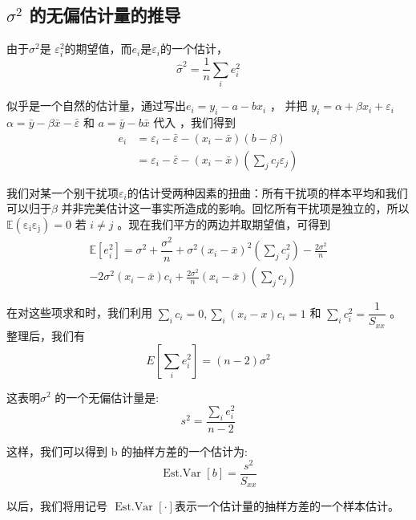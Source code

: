 \subsection{ \texorpdfstring{$ \sigma^{2} $}{σ2 } 的无偏估计量的推导}

由于$ \sigma^{2} $是 $ \varepsilon_{i} ^{2} $的期望值，而$e_{i}$是$\varepsilon_{i} $的一个估计，
$$ \hat{\sigma}^{2}=\frac{1}{n} \sum_{i} e_{i}^{2} $$

似乎是一个自然的估计量，通过写出$ e_{i} = y_{i} − a − bx_{i}  $ ， 并把 $  y_{i}=\alpha+\beta x_{i}+\varepsilon_{i} $  $\alpha=\bar{y}-\beta \bar{x}-\bar{\varepsilon}$
 和  $ a=\bar{y}-b \bar{x} $ 代入 ，我们得到
\begin{equation}
    \begin{aligned}
        e_{i} &=\varepsilon_{i}-\bar{\varepsilon}-\left(x_{i}-\bar{x}\right)(b-\beta) \\
              &=\varepsilon_{i}-\bar{\varepsilon}-\left(x_{i}-\bar{x}\right)\left(\sum_{j} c_{j} \varepsilon_{j}\right)
    \end{aligned}
    \label{eq 4.4.1}
\end{equation}

我们对某一个别干扰项$ \varepsilon_{i} $的估计受两种因素的扭曲：所有干扰项的样本平均和我们可以归于$ \beta $ 并非完美估计这一事实所造成的影响。回忆所有干扰项是独立的，所以 
$ \operatorname{ \mathbb{E}( \varepsilon_{i}  \varepsilon_{j} )} = 0 $ 若 $i \neq j$ 。现在我们平方的两边并取期望值，可得到
$$
\begin{array}{c}
    \mathbb{E}\left[e_{i}^{2}\right]=\sigma^{2}+\dfrac{\sigma^{2}}{n}+\sigma^{2}\left(x_{i}-\bar{x}\right)^{2}\left(\sum_{j} c_{j}^{2}\right)-\frac{2 \sigma^{2}}{n} \\
    -2 \sigma^{2}\left(x_{i}-\bar{x}\right) c_{i}+\frac{2 \sigma^{2}}{n}\left(x_{i}-\bar{x}\right)\left(\sum_{j} c_{j}\right)
\end{array}$$

 在对这些项求和时，我们利用 $\sum_{i} c_{i} = 0, \sum_{i} (x_{i} − x)c_{i} = 1 $ 和 $\sum_{i}c_{i} ^2 =\dfrac{ 1 }{S_{xx} } $ 。整理后，我们有
$$ E\left[\sum_{i} e_{i}^{2}\right]=(n-2) \sigma^{2} $$

这表明$ \sigma^{2} $ 的一个无偏估计量是:
$$ s^{2}=\frac{\sum_{i} e_{i}^{2}}{n-2} $$

这样，我们可以得到 b 的抽样方差的一个估计为:
$$\text { Est.Var }[b]=\frac{s^{2}}{S_{x x}}$$

以后，我们将用记号 $\text { Est.Var }[\cdot]$表示一个估计量的抽样方差的一个样本估计。

